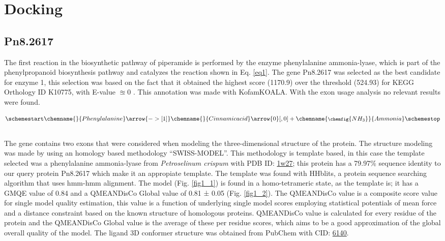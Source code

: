 \documentclass[12pt]{article}
\begin{document}
	
	\section{Docking}
	
	\subsection{Pn8.2617}
	
	The first reaction in the biosynthetic pathway of piperamide is performed by the enzyme phenylalanine ammonia-lyase, which is part of the phenylpropanoid biosynthesis pathway and catalyzes the reaction shown in Eq. \ref{eq1}. The gene Pn8.2617 was selected as the best candidate for enzyme 1, this selection was based on the fact that it obtained the highest score (1170.9) over the threshold (524.93) for KEGG Orthology ID K10775, with E-value $\approxeq 0$ . This annotation was made with KofamKOALA. \cite{kofamkoala} With the exon usage analysis no relevant results were found.
	
	
	\begin{equation}
		\schemestart
		 \label{eq1}
		\chemname{\footnotesize}{Phenylalanine}\arrow{->[\footnotesize 1]}\chemname{\footnotesize}{Cinnamic acid}
		\arrow{0}[,0]+
		\chemname{\footnotesize\chemfig{NH_3}}{Ammonia}
		\schemestop
	\end{equation}\\
	
	The gene contains two exons that were considered when modeling the three-dimensional structure of the protein. The structure modeling was made by using an homology based methodology ``SWISS-MODEL''. \cite{swiss,quaternary_swiss} This methodology is template based, in this case the template selected was a phenylalanine ammonia-lyase from \textit{Petroselinum crispum} with PDB ID: \href{https://www.rcsb.org/structure/1w27}{1w27}; this protein has a 79.97\% sequence identity to our query protein Pn8.2617 which make it an appropiate template. The template was found with HHblits, a protein sequence searching algorithm that uses hmm-hmm alignment. \cite{hhblits} The model (Fig. \ref{fig1_1}) is found in a homo-tetrameric state, as the template is; it has a GMQE value of 0.84 and a QMEANDisCo Global value of 0.81 ± 0.05 (Fig. \ref{fig1_2}). The QMEANDisCo value is a composite score value for single model quality estimation, this value is a function of underlying single model scores employing statistical potentials of mean force and a distance constraint based on the known structure of homologous proteins. QMEANDisCo value is calculated for every residue of the protein and the QMEANDisCo Global value is the average of these per residue scores, which aims to be a good approximation of the global overall quality of the model. \cite{qmeandisco_swiss} The ligand 3D conformer structure was obtained from PubChem with CID: \href{https://pubchem.ncbi.nlm.nih.gov/compound/6140}{6140}.
\end{document}

